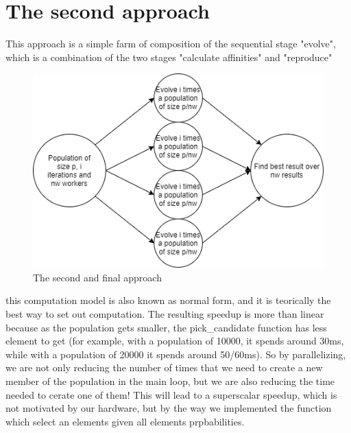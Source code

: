 \documentclass{article}
\begin{document}
    \section{The second approach}\label{sec:s3}
	This approach is a simple farm of composition of the sequential stage "evolve", which is a combination of the two stages "calculate affinities" and "reproduce"
    \begin{figure}
        \includegraphics[width=\linewidth]{img/second.png}
        \caption{The second and final approach}
        \label{fig:second}
    \end{figure}
    this computation model is also known as normal form, and it is teorically the best way to set out computation. The resulting speedup is more than linear because as the population gets smaller, the pick\_candidate function has less element to get (for example, with a population of 10000, it spends around 30ms, while with a population of 20000 it spends around 50/60ms). So by parallelizing, we are not only reducing the number of times that we need to create a new member of the population in the main loop, but we are also reducing the time needed to cerate one of them! This will lead to a superscalar speedup, which is not motivated by our hardware, but by the way we implemented the function which select an elements given all elements prpbabilities.
\end{document}
